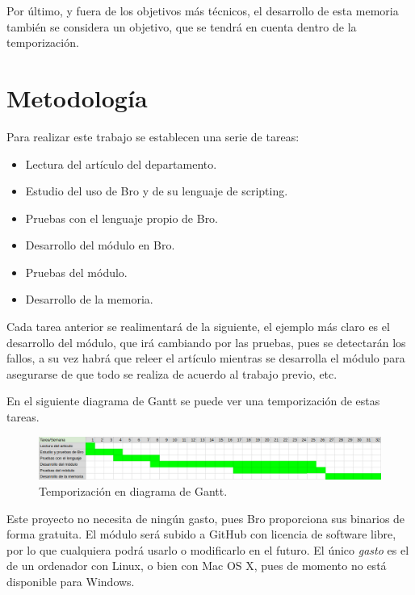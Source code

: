 \intro Por último, y fuera de los objetivos más técnicos, el desarrollo de esta memoria también se 
considera un objetivo, que se tendrá en cuenta dentro de la temporización.

\section{Metodología}

Para realizar este trabajo se establecen una serie de tareas:

\begin{itemize}
\item Lectura del artículo del departamento. \cite{comparacion}
\item Estudio del uso de Bro y de su lenguaje de scripting.
\item Pruebas con el lenguaje propio de Bro.
\item Desarrollo del módulo en Bro.
\item Pruebas del módulo.
\item Desarrollo de la memoria.
\end{itemize}

Cada tarea anterior se realimentará de la siguiente, el ejemplo más claro es el desarrollo del módulo, que 
irá cambiando por las pruebas, pues se detectarán los fallos, a su vez habrá que releer el artículo mientras 
se desarrolla el módulo para asegurarse de que todo se realiza de acuerdo al trabajo previo, etc.

\intro En el siguiente diagrama de Gantt se puede ver una temporización de estas tareas. 

\begin{figure}[H]
  \includegraphics[width=1\textwidth]{imagenes/temporizacion.png} 
  \centering
  \caption{Temporización en diagrama de Gantt.}
\end{figure}

Este proyecto no necesita de ningún gasto, pues Bro \cite{broindex} proporciona sus binarios de 
forma gratuita. El módulo será subido a GitHub \cite{repo} con licencia de software libre, por lo que cualquiera 
podrá usarlo o modificarlo en el futuro. El único \textit{gasto} es el de un ordenador con Linux, 
o bien con Mac OS X, pues de momento no está disponible para Windows. \cite{brodownload}

